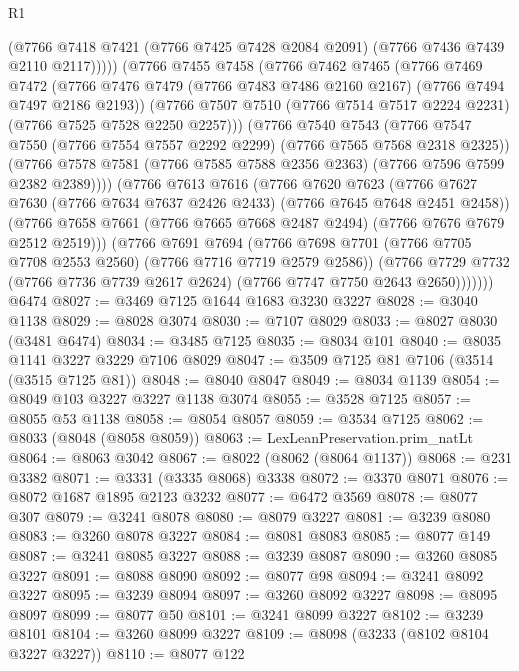 \begin{lexlean}{R1}
\begin{coremodule}
              (@7766 @7418 @7421 (@7766 @7425 @7428 @2084 @2091) (@7766 @7436 @7439 @2110 @2117)))))
        (@7766
          @7455
          @7458
          (@7766
            @7462
            @7465
            (@7766
              @7469
              @7472
              (@7766 @7476 @7479 (@7766 @7483 @7486 @2160 @2167) (@7766 @7494 @7497 @2186 @2193))
              (@7766 @7507 @7510 (@7766 @7514 @7517 @2224 @2231) (@7766 @7525 @7528 @2250 @2257)))
            (@7766
              @7540
              @7543
              (@7766 @7547 @7550 (@7766 @7554 @7557 @2292 @2299) (@7766 @7565 @7568 @2318 @2325))
              (@7766 @7578 @7581 (@7766 @7585 @7588 @2356 @2363) (@7766 @7596 @7599 @2382 @2389))))
          (@7766
            @7613
            @7616
            (@7766
              @7620
              @7623
              (@7766 @7627 @7630 (@7766 @7634 @7637 @2426 @2433) (@7766 @7645 @7648 @2451 @2458))
              (@7766 @7658 @7661 (@7766 @7665 @7668 @2487 @2494) (@7766 @7676 @7679 @2512 @2519)))
            (@7766
              @7691
              @7694
              (@7766 @7698 @7701 (@7766 @7705 @7708 @2553 @2560) (@7766 @7716 @7719 @2579 @2586))
              (@7766
                @7729
                @7732
                (@7766 @7736 @7739 @2617 @2624)
                (@7766 @7747 @7750 @2643 @2650)))))))
    @6474
@8027 := @3469 @7125 @1644 @1683 @3230 @3227
@8028 := @3040 @1138
@8029 := @8028 @3074
@8030 := @7107 @8029
@8033 := @8027 @8030 (@3481 @6474)
@8034 := @3485 @7125
@8035 := @8034 @101
@8040 := @8035 @1141 @3227 @3229 @7106 @8029
@8047 := @3509 @7125 @81 @7106 (@3514 (@3515 @7125 @81))
@8048 := @8040 @8047
@8049 := @8034 @1139
@8054 := @8049 @103 @3227 @3227 @1138 @3074
@8055 := @3528 @7125
@8057 := @8055 @53 @1138
@8058 := @8054 @8057
@8059 := @3534 @7125
@8062 := @8033 (@8048 (@8058 @8059))
@8063 := LexLeanPreservation.prim_natLt
@8064 := @8063 @3042
@8067 := @8022 (@8062 (@8064 @1137))
@8068 := @231 @3382
@8071 := @3331 (@3335 @8068) @3338
@8072 := @3370 @8071
@8076 := @8072 @1687 @1895 @2123 @3232
@8077 := @6472 @3569
@8078 := @8077 @307
@8079 := @3241 @8078
@8080 := @8079 @3227
@8081 := @3239 @8080
@8083 := @3260 @8078 @3227
@8084 := @8081 @8083
@8085 := @8077 @149
@8087 := @3241 @8085 @3227
@8088 := @3239 @8087
@8090 := @3260 @8085 @3227
@8091 := @8088 @8090
@8092 := @8077 @98
@8094 := @3241 @8092 @3227
@8095 := @3239 @8094
@8097 := @3260 @8092 @3227
@8098 := @8095 @8097
@8099 := @8077 @50
@8101 := @3241 @8099 @3227
@8102 := @3239 @8101
@8104 := @3260 @8099 @3227
@8109 := @8098 (@3233 (@8102 @8104 @3227 @3227))
@8110 := @8077 @122

\end{coremodule}
\end{lexlean}

